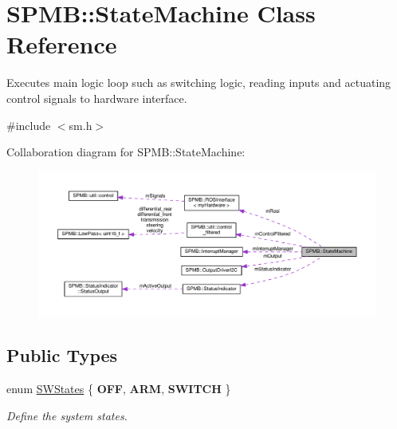 \hypertarget{classSPMB_1_1StateMachine}{}\section{S\+P\+MB\+:\+:State\+Machine Class Reference}
\label{classSPMB_1_1StateMachine}


Executes main logic loop such as switching logic, reading inputs and actuating control signals to hardware interface.  




{\ttfamily \#include $<$sm.\+h$>$}



Collaboration diagram for S\+P\+MB\+:\+:State\+Machine\+:\nopagebreak
\begin{figure}[H]
\begin{center}
\leavevmode
\includegraphics[width=350pt]{classSPMB_1_1StateMachine__coll__graph}
\end{center}
\end{figure}
\subsection*{Public Types}
\begin{DoxyCompactItemize}
\item 
enum \hyperlink{classSPMB_1_1StateMachine_aa3228b2d3b74bb31a7ac7f7a20f6da37}{S\+W\+States} \{ {\bfseries O\+FF}, 
{\bfseries A\+RM}, 
{\bfseries S\+W\+I\+T\+CH}
 \}\hypertarget{classSPMB_1_1StateMachine_aa3228b2d3b74bb31a7ac7f7a20f6da37}{}\label{classSPMB_1_1StateMachine_aa3228b2d3b74bb31a7ac7f7a20f6da37}
\begin{DoxyCompactList}\small\item\em Define the system states. \end{DoxyCompactList}
\end{DoxyCompactItemize}
